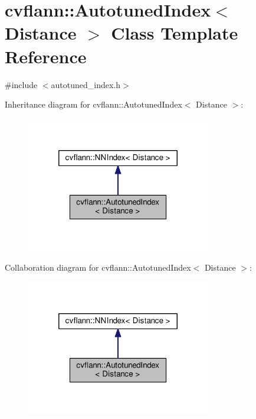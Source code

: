 \hypertarget{classcvflann_1_1AutotunedIndex}{\section{cvflann\-:\-:Autotuned\-Index$<$ Distance $>$ Class Template Reference}
\label{classcvflann_1_1AutotunedIndex}
}


{\ttfamily \#include $<$autotuned\-\_\-index.\-h$>$}



Inheritance diagram for cvflann\-:\-:Autotuned\-Index$<$ Distance $>$\-:\nopagebreak
\begin{figure}[H]
\begin{center}
\leavevmode
\includegraphics[width=228pt]{classcvflann_1_1AutotunedIndex__inherit__graph}
\end{center}
\end{figure}


Collaboration diagram for cvflann\-:\-:Autotuned\-Index$<$ Distance $>$\-:\nopagebreak
\begin{figure}[H]
\begin{center}
\leavevmode
\includegraphics[width=228pt]{classcvflann_1_1AutotunedIndex__coll__graph}
\end{center}
\end{figure}
